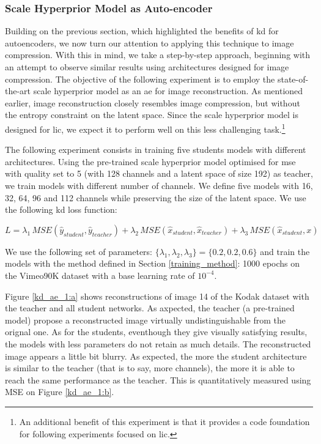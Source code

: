 \documentclass{article}
\begin{document}
\subsubsection{Scale Hyperprior Model as Auto-encoder}
\label{scale_hyperprior_ae}
Building on the previous section, which highlighted the benefits of \acrshort{kd} for autoencoders, we now turn our attention to applying this technique to image compression. With this in mind, we take a step-by-step approach, beginning with an attempt to observe similar results using architectures designed for image compression. The objective of the following experiment is to employ the state-of-the-art scale hyperprior model as an \acrshort{ae} for image reconstruction. As mentioned earlier, image reconstruction closely resembles image compression, but without the entropy constraint on the latent space. Since the scale hyperprior model is designed for \acrshort{lic}, we expect it to perform well on this less challenging task.\footnote{An additional benefit of this experiment is that it provides a code foundation for following experiments focused on \acrshort{lic}.}

The following experiment consists in training five students models with different architectures. Using the pre-trained scale hyperprior model optimised for \acrshort{mse} with \textsf{quality} set to 5 (with 128 channels and a latent space of size 192) as teacher, we train models with different number of channels. We define five models with 16, 32, 64, 96 and 112 channels while preserving the size of the latent space. We use the following \acrshort{kd} loss function:

\begin{equation}
    L = \lambda_{1}\, MSE(\hat{y}_{student}, \hat{y}_{teacher}) + \lambda_{2}\, MSE(\hat{x}_{student}, \hat{x}_{teacher}) + \lambda_{3}\, MSE(\hat{x}_{student}, x)
    \label{loss_1}
\end{equation}

We use the following set of parameters: \(\{\lambda_{1}, \lambda_{2}, \lambda_{3}\} = \{0.2, 0.2, 0.6\}\) and train the models with the method defined in Section \ref{training_method}: 1000 epochs on the Vimeo90K dataset with a base learning rate of \(10^{-4}\).

Figure \ref{kd_ae_1:a} shows reconstructions of image 14 of the Kodak dataset with the teacher and all student networks. As axpected, the teacher (a pre-trained model) propose a reconstructed image virtually undistinguishable from the orignal one. As for the students, eventhough they give visually satisfying results, the models with less parameters do not retain as much details. The reconstructed image appears a little bit blurry. As expected, the more the student architecture is similar to the teacher (that is to say, more channels), the more it is able to reach the same performance as the teacher. This is quantitatively measured using MSE on Figure \ref{kd_ae_1:b}.
\end{document}
